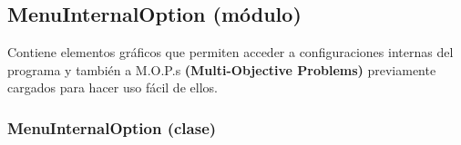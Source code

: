 \documentclass[class=report, crop=false]{standalone}
\begin{document}
\subsection{MenuInternalOption (módulo)}
\label{sec:a_3_3_2}
Contiene elementos gráficos que permiten acceder a configuraciones 
internas del programa y también a M.O.P.s \textbf{(Multi-Objective Problems)} 
previamente cargados para hacer uso fácil de ellos.

\subsubsection{MenuInternalOption (clase)}
\label{sec:a_3_3_2_1}
\end{document}
